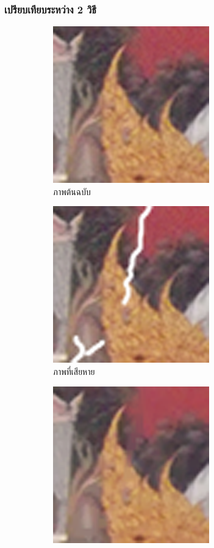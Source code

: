 \documentclass[xcolor=dvipsnames, xetex,serif]{beamer}
\numberwithin{equation}{section}
\begin{document}
    \begin{frame}
        \frametitle{เปรียบเทียบระหว่าง 2 วิธี}
        \begin{figure}[H]
            \centering
            \begin{subfigure}{0.4\linewidth}
                \centering
                \includegraphics[width=0.6\linewidth]{images/result_ex4_scaleup/original.png}
                \caption{ภาพต้นฉบับ}
            \end{subfigure}
            \begin{subfigure}{0.4\linewidth}
                \centering
                \includegraphics[width=0.6\linewidth]{images/result_ex4_scaleup/toinpaint.png}
                \caption{ภาพที่เสียหาย}
            \end{subfigure}
            \begin{subfigure}{0.4\linewidth}
                \centering
                \includegraphics[width=0.6\linewidth]{images/result_ex4_scaleup/splitbregman.png}			

\end{subfigure}
\end{figure}
\end{frame}
\end{document}
